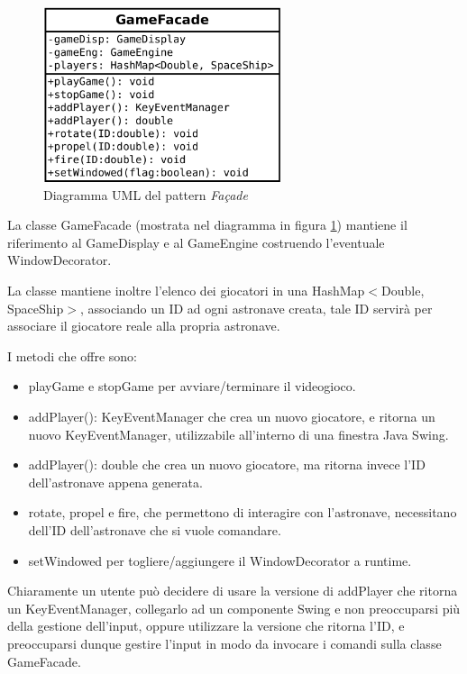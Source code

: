 \documentclass[a4paper,12pt]{article}
\begin{document}
\begin{figure}[h]
\centering
\includegraphics[width=7cm]{Facade.pdf}
\caption{Diagramma UML del pattern \emph{Façade}}
\label{img:Facade}
\end{figure}

La classe \textsf{GameFacade} (mostrata nel diagramma in figura \ref{img:Facade}) mantiene il riferimento al \textsf{GameDisplay} e al \textsf{GameEngine} costruendo l'eventuale \textsf{WindowDecorator}.

La classe mantiene inoltre l'elenco dei giocatori in una \textsf{HashMap}$<$\textsf{Double}, \textsf{SpaceShip}$>$, associando un ID ad ogni astronave creata, tale ID servir\`a per associare il giocatore reale alla propria astronave.

I metodi che offre sono:
\begin{itemize}
\item \textsf{playGame} e \textsf{stopGame} per avviare/terminare il videogioco.
\item \textsf{addPlayer(): KeyEventManager} che crea un nuovo giocatore, e ritorna un nuovo \textsf{KeyEventManager}, utilizzabile all'interno di una finestra Java Swing.
\item \textsf{addPlayer(): double} che crea un nuovo giocatore, ma ritorna invece l'ID dell'astronave appena generata.
\item \textsf{rotate}, \textsf{propel} e \textsf{fire}, che permettono di interagire con l'astronave, necessitano dell'ID dell'astronave che si vuole comandare.
\item \textsf{setWindowed} per togliere/aggiungere il \textsf{WindowDecorator} a runtime.
\end{itemize}

Chiaramente un utente pu\`o decidere di usare la versione di \textsf{addPlayer} che ritorna un \textsf{KeyEventManager}, collegarlo ad un componente Swing e non preoccuparsi pi\`u della gestione dell'input, oppure utilizzare la versione che ritorna l'ID, e preoccuparsi dunque gestire l'input in modo da invocare i comandi sulla classe \textsf{GameFacade}.
\end{document}
